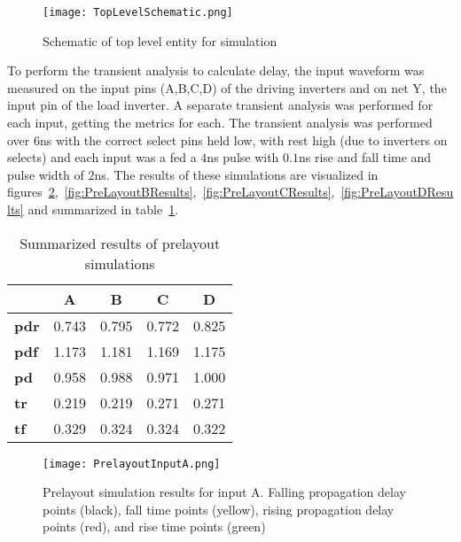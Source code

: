 \documentclass[conference]{IEEEtran}
\begin{document}
  \begin{figure}[H]
  \center
    \texttt{[image: TopLevelSchematic.png]}
    \caption{Schematic of top level entity for simulation}
    \label{fig:TopLevelSchematic}
  \end{figure} 

  To perform the transient analysis to calculate delay, the input waveform was measured on the input pins (A,B,C,D) of the driving inverters and on net Y, the input pin of the load inverter. A separate transient analysis was performed for each input, getting the metrics for each. The transient analysis was performed over $6$ns with the correct select pins held low, with rest high (due to inverters on selects) and each input was a fed a $4$ns pulse with $0.1$ns rise and fall time and pulse width of $2$ns. The results of these simulations are visualized in figures~\ref{fig:PreLayoutAResults},~\ref{fig:PreLayoutBResults},~\ref{fig:PreLayoutCResults},~\ref{fig:PreLayoutDResults} and summarized in table~\ref{tab:PreLayoutResults}.


  \begin{table}[H]
  \center
\begin{tabular}{|l|c|c|c|c|}
\hline
             & \textbf{A} & \textbf{B} & \textbf{C} & \textbf{D} \\ \hline
\textbf{pdr} & 0.743      & 0.795      & 0.772      & 0.825      \\ \hline
\textbf{pdf} & 1.173      & 1.181      & 1.169      & 1.175      \\ \hline
\textbf{pd}  & 0.958      & 0.988      & 0.971      & 1.000      \\ \hline
\textbf{tr}  & 0.219      & 0.219      & 0.271      & 0.271      \\ \hline
\textbf{tf}  & 0.329      & 0.324      & 0.324      & 0.322      \\ \hline
\end{tabular}
\caption{Summarized results of prelayout simulations}
\label{tab:PreLayoutResults}
\end{table}

  \begin{figure}[H]
  \center
    \texttt{[image: PrelayoutInputA.png]}
    \caption{Prelayout simulation results for input A. Falling propagation delay points (black), fall time points (yellow), rising propagation delay points (red), and rise time points (green)}
    \label{fig:PreLayoutAResults}
  \end{figure} 
\end{document}
